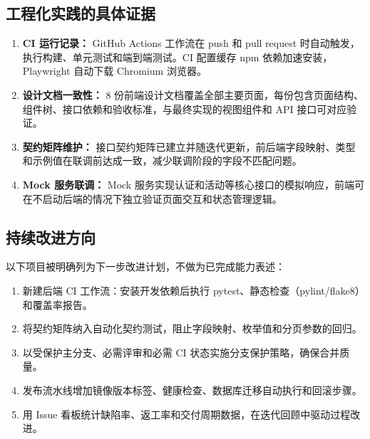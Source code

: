 \documentclass[12pt,a4paper]{ctexart}
\begin{document}
\subsection{工程化实践的具体证据}
\begin{enumerate}
\item \textbf{CI 运行记录：} GitHub Actions 工作流在 push 和 pull request 时自动触发，执行构建、单元测试和端到端测试。CI 配置缓存 npm 依赖加速安装，Playwright 自动下载 Chromium 浏览器。
\item \textbf{设计文档一致性：} 8 份前端设计文档覆盖全部主要页面，每份包含页面结构、组件树、接口依赖和验收标准，与最终实现的视图组件和 API 接口可对应验证。
\item \textbf{契约矩阵维护：} 接口契约矩阵已建立并随迭代更新，前后端字段映射、类型和示例值在联调前达成一致，减少联调阶段的字段不匹配问题。
\item \textbf{Mock 服务联调：} Mock 服务实现认证和活动等核心接口的模拟响应，前端可在不启动后端的情况下独立验证页面交互和状态管理逻辑。
\end{enumerate}

\subsection{持续改进方向}
以下项目被明确列为下一步改进计划，不做为已完成能力表述：
\begin{enumerate}
\item 新建后端 CI 工作流：安装开发依赖后执行 pytest、静态检查（pylint/flake8）和覆盖率报告。
\item 将契约矩阵纳入自动化契约测试，阻止字段映射、枚举值和分页参数的回归。
\item 以受保护主分支、必需评审和必需 CI 状态实施分支保护策略，确保合并质量。
\item 发布流水线增加镜像版本标签、健康检查、数据库迁移自动执行和回滚步骤。
\item 用 Issue 看板统计缺陷率、返工率和交付周期数据，在迭代回顾中驱动过程改进。
\end{enumerate}
\end{document}
